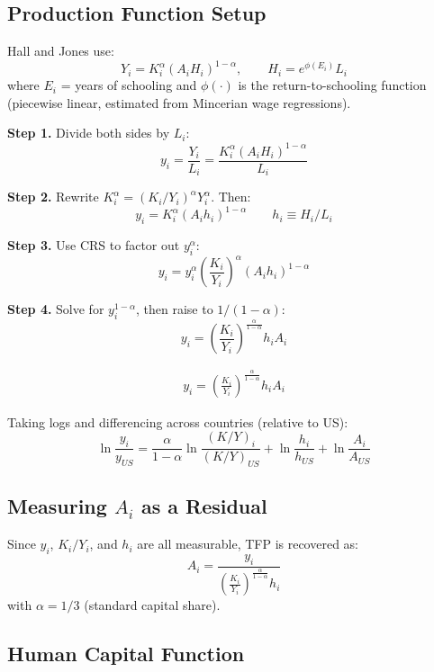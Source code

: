 \documentclass[a4paper,11pt]{article}
\begin{document}
\subsection*{Production Function Setup}

Hall and Jones use:
\[
Y_i = K_i^\alpha (A_i H_i)^{1-\alpha}, \qquad H_i = e^{\phi(E_i)} L_i
\]
where $E_i$ = years of schooling and $\phi(\cdot)$ is the return-to-schooling function (piecewise linear, estimated from Mincerian wage regressions).

\begin{derivationbox}[title={Derivation: Output per Worker Decomposition}]
\textbf{Step 1.} Divide both sides by $L_i$:
\[
y_i = \frac{Y_i}{L_i} = \frac{K_i^\alpha (A_i H_i)^{1-\alpha}}{L_i}
\]

\textbf{Step 2.} Rewrite $K_i^\alpha = (K_i / Y_i)^{\alpha} Y_i^{\alpha}$. Then:
\[
y_i = K_i^\alpha (A_i h_i)^{1-\alpha} \qquad h_i \equiv H_i/L_i
\]

\textbf{Step 3.} Use CRS to factor out $y_i^\alpha$:
\[
y_i = y_i^{\alpha} \left(\frac{K_i}{Y_i}\right)^{\alpha} (A_i h_i)^{1-\alpha}
\]

\textbf{Step 4.} Solve for $y_i^{1-\alpha}$, then raise to $1/(1-\alpha)$:
\[
y_i = \left(\frac{K_i}{Y_i}\right)^{\frac{\alpha}{1-\alpha}} h_i A_i
\]
\end{derivationbox}

\begin{resultbox}
\begin{align*}
\boxed{y_i = \left(\frac{K_i}{Y_i}\right)^{\frac{\alpha}{1-\alpha}} h_i A_i}
\tag{HJ Decomposition}
\end{align*}

Taking logs and differencing across countries (relative to US):
\[
\ln\!\frac{y_i}{y_{US}} = \frac{\alpha}{1-\alpha}\ln\!\frac{(K/Y)_i}{(K/Y)_{US}} + \ln\!\frac{h_i}{h_{US}} + \ln\!\frac{A_i}{A_{US}}
\]
\end{resultbox}

\subsection*{Measuring $A_i$ as a Residual}

Since $y_i$, $K_i/Y_i$, and $h_i$ are all measurable, TFP is recovered as:
\[
A_i = \frac{y_i}{\left(\frac{K_i}{Y_i}\right)^{\frac{\alpha}{1-\alpha}} h_i}
\tag{TFP Residual}
\]
with $\alpha = 1/3$ (standard capital share).

\subsection*{Human Capital Function}
\end{document}
